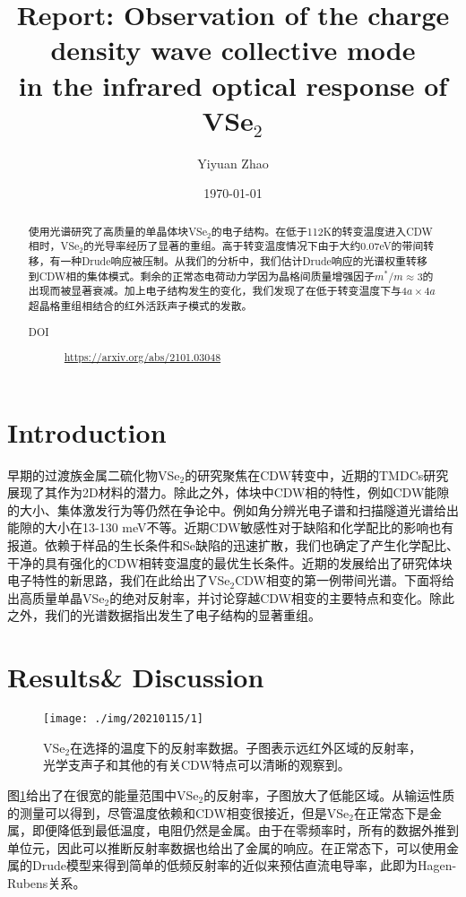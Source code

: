 \documentclass[reprint, aps, prb, showkeys]{revtex4-2}
\begin{document}
\title{Report: Observation of the charge density wave collective mode\\
in the infrared optical response of VSe$_2$}

\author{Yiyuan Zhao}
\date{\today}

\begin{abstract}
使用光谱研究了高质量的单晶体块VSe$_2$的电子结构。在低于112K的转变温度进入CDW相时，VSe$_2$的光导率经历了显著的重组。高于转变温度情况下由于大约0.07eV的带间转移，有一种Drude响应被压制。从我们的分析中，我们估计Drude响应的光谱权重转移到CDW相的集体模式。剩余的正常态电荷动力学因为晶格间质量增强因子$m^{*}/m \approx 3$的出现而被显著衰减。加上电子结构发生的变化，我们发现了在低于转变温度下与$4a \times 4a$超晶格重组相结合的红外活跃声子模式的发散。
\begin{description}
    \item[DOI] \url{https://arxiv.org/abs/2101.03048}
\end{description}
\end{abstract}


\maketitle

\section{Introduction}
早期的过渡族金属二硫化物VSe$_2$的研究聚焦在CDW转变中，近期的TMDCs研究展现了其作为2D材料的潜力。除此之外，体块中CDW相的特性，例如CDW能隙的大小、集体激发行为等仍然在争论中。例如角分辨光电子谱和扫描隧道光谱给出能隙的大小在13-130 meV不等。近期CDW敏感性对于缺陷和化学配比的影响也有报道。依赖于样品的生长条件和Se缺陷的迅速扩散，我们也确定了产生化学配比、干净的具有强化的CDW相转变温度的最优生长条件。近期的发展给出了研究体块电子特性的新思路，我们在此给出了VSe$_2$CDW相变的第一例带间光谱。下面将给出高质量单晶VSe$_2$的绝对反射率，并讨论穿越CDW相变的主要特点和变化。除此之外，我们的光谱数据指出发生了电子结构的显著重组。

\section{Results\& Discussion}
\begin{figure}[t]
    \texttt{[image: ./img/20210115/1]}
    \caption{\label{fig:reflectivity} 
    VSe$_2$在选择的温度下的反射率数据。子图表示远红外区域的反射率，光学支声子和其他的有关CDW特点可以清晰的观察到。
    }
\end{figure}
图\ref{fig:reflectivity}给出了在很宽的能量范围中VSe$_2$的反射率，子图放大了低能区域。从输运性质的测量可以得到，尽管温度依赖和CDW相变很接近，但是VSe$_2$在正常态下是金属，即便降低到最低温度，电阻仍然是金属。由于在零频率时，所有的数据外推到单位元，因此可以推断反射率数据也给出了金属的响应。在正常态下，可以使用金属的Drude模型来得到简单的低频反射率的近似来预估直流电导率，此即为Hagen-Rubens关系。
\end{document}
